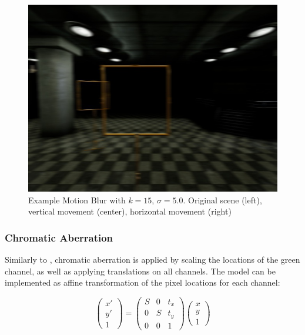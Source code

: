 \begin{figure}[htbp]
\begin{minipage}{0.33\textwidth}
		\includegraphics[width=\textwidth]{fig/gate_example_motionblur_h}
	\end{minipage}
	\caption{Example Motion Blur with $k=15$, $\sigma=5.0$. Original scene (left), vertical movement (center), horizontal movement (right)}
	\label{fig:motionblur}
\end{figure}

\subsubsection{Chromatic Aberration}

Similarly to \cite{Carlson2018}, chromatic aberration is applied by scaling the locations of the green channel, as well as applying translations on all channels. The model can be implemented as affine transformation of the pixel locations for each channel:

\begin{equation}
	\begin{pmatrix}
	x' \\
	y' \\
	1
	\end{pmatrix} = \begin{pmatrix}
	S & 0 & t_x \\
	0 & S & t_y \\
	0 & 0 & 1
	\end{pmatrix} \begin{pmatrix}
	x \\
	y \\
	1
	\end{pmatrix}
\end{equation}

